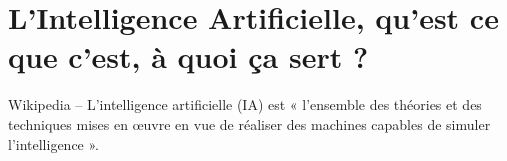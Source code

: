 \def\xxactivite{Cours}
\def\xxauteur{\textsl{Xavier Pessoles \& Anthony Meurdefroid}}

\fichefalse
\proftrue
\tdfalse
\courstrue

\def\xxnumchapitre{Chapitre 1 \vspace{.2cm}}
\def\xxchapitre{\hspace{.12cm} Introduction}

\def\xxcompetences{%
\textsl{%
\textbf{Savoirs et compétences :}\\
\begin{itemize}[label=\ding{112},font=\color{ocre}] 
\item A voir
\end{itemize}
}}



\def\xxfigures{
}%

\iflivret

\else

\fi
\setlength{\columnseprule}{.1pt}

\vspace{2cm}
\pagestyle{fancy}
\thispagestyle{plain}








\section{L'Intelligence Artificielle, qu'est ce que c'est, à quoi ça sert ?}

\begin{defi}
Wikipedia -- L'intelligence artificielle (IA) est « l'ensemble des théories et des techniques mises en œuvre en vue de réaliser des machines capables de simuler l'intelligence ». 
\end{defi}

